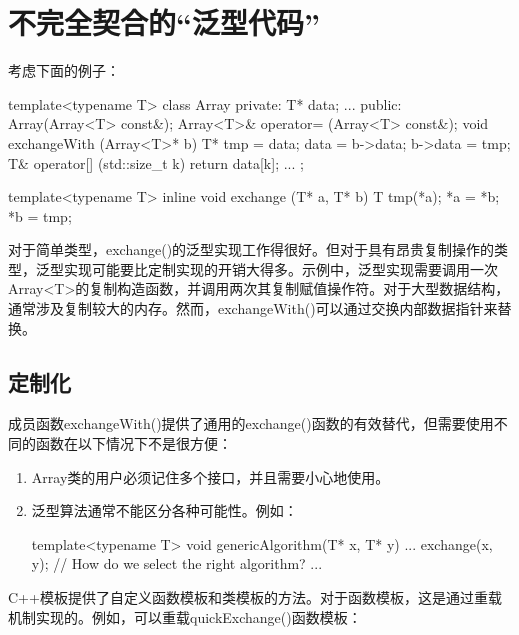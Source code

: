 \section{不完全契合的“泛型代码”}

考虑下面的例子：

\begin{cpp}
template<typename T>
class Array {
	private:
	T* data;
	...
	public:
	Array(Array<T> const&);
	Array<T>& operator= (Array<T> const&);
	void exchangeWith (Array<T>* b) {
		T* tmp = data;
		data = b->data;
		b->data = tmp;
	}
	T& operator[] (std::size_t k) {
		return data[k];
	}
	...
};

template<typename T> inline
void exchange (T* a, T* b)
{
T tmp(*a);
*a = *b;
*b = tmp;
}
\end{cpp}

对于简单类型，exchange()的泛型实现工作得很好。但对于具有昂贵复制操作的类型，泛型实现可能要比定制实现的开销大得多。示例中，泛型实现需要调用一次Array<T>的复制构造函数，并调用两次其复制赋值操作符。对于大型数据结构，通常涉及复制较大的内存。然而，exchangeWith()可以通过交换内部数据指针来替换。

\subsection{定制化}

成员函数exchangeWith()提供了通用的exchange()函数的有效替代，但需要使用不同的函数在以下情况下不是很方便：

\begin{enumerate}
\item 
Array类的用户必须记住多个接口，并且需要小心地使用。

\item 
泛型算法通常不能区分各种可能性。例如：

\begin{cpp}
template<typename T>
void genericAlgorithm(T* x, T* y)
{
	...
	exchange(x, y); // How do we select the right algorithm?
	...
}
\end{cpp}

\end{enumerate}

C++模板提供了自定义函数模板和类模板的方法。对于函数模板，这是通过重载机制实现的。例如，可以重载quickExchange()函数模板：


